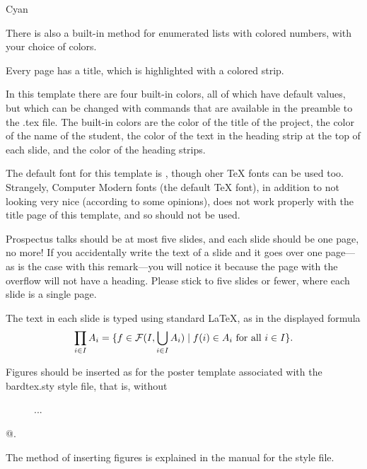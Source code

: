 \documentclass[12pt, oneside, reqno]{article}
\begin{document}
\begin{enumeratecp}{Cyan}
\item 
There is also a built-in method for enumerated lists with colored numbers, with your choice of colors.

\item
Every page has a title, which is highlighted with a colored strip.

\item
In this template there are four built-in colors, all of which have default values, but which can be changed with commands that are available in the preamble to the .tex file.  The built-in colors are the color of the title of the project, the color of the name of the student, the color of the text in the heading strip at the top of each slide, and the color of the heading strips.

\item
The default font for this template is \verb@fourier@, though oher TeX fonts can be used too.  Strangely, Computer Modern fonts (the default TeX font), in addition to not looking very nice (according to some opinions), does not work properly with the title page of this template, and so should not be used.

\item
Prospectus talks should be at most five slides, and each slide should be one page, no more!  If you accidentally write the text of a slide and it goes over one page---as is the case with this remark---you will notice it because the page with the overflow will not have a heading.  Please stick to five slides or fewer, where each slide is a single page.

\end{enumeratecp}



The text in each slide is typed using standard LaTeX, as in the displayed formula
%
\[
\prod_{i \in I} A_i = \{f \in {\mathcal{F}}({I}, {\bigcup_{i \in I} A_i}) \mid f(i) \in A_i \text{ for all } i \in I\}. 
\]
%

Figures should be inserted as for the poster template associated with the \textsf{bardtex.sty} style file, that is, without 
\begin{center}
\verb@\begin{figure} ... \end{figure}@. 
\end{center}
The method of inserting figures is explained in the manual for the style file.
\end{document}
